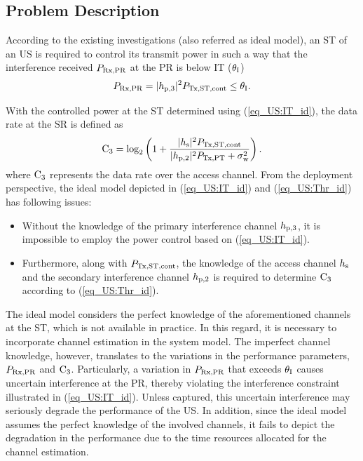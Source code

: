 \subsection{Problem Description} \label{ssec_US:pd}
According to the existing investigations (also referred as ideal model), an ST of an US is required to control its transmit power in such a way that the interference received $P_{\text{Rx,PR}}$ at the PR is below IT ($\theta_{\text{I}}$) \cite{Xing07}
\begin{equation}
P_{\text{Rx,PR}} = |h_{\text{p,3}}|^2 P_{\text{Tx,ST,cont}} \le \theta_{\text{I}}.
\label{eq_US:IT_id}
\end{equation}

With the controlled power at the ST determined using (\ref{eq_US:IT_id}), the data rate at the SR is defined as
\begin{equation}
\text{C}_{\text{3}} = \log_2 \left(1 + \frac{|h_{\text{s}}|^2 P_{\text{Tx,ST,cont}}}{ |h_{\text{p,2}}|^2 P_{\text{Tx,PT}} + \sigma^2_{\text{w}}} \right). 
\label{eq_US:Thr_id}
\end{equation}
where $\text{C}_{\text{3}}$ represents the data rate over the access channel. %
From the deployment perspective, the ideal model depicted in (\ref{eq_US:IT_id}) and (\ref{eq_US:Thr_id}) has following issues:
\begin{itemize}
\item Without the knowledge of the primary interference channel $h_{\text{p,3}}$, it is impossible to employ the power control based on (\ref{eq_US:IT_id}). 
\item Furthermore, along with $P_{\text{Tx,ST,cont}}$, the knowledge of the access channel $h_{\text{s}}$ and the secondary interference channel $h_{\text{p,2}}$ is required to determine $\text{C}_{\text{3}}$ according to (\ref{eq_US:Thr_id}).
\end{itemize}
The ideal model considers the perfect knowledge of the aforementioned channels at the ST, which is not available in practice. In this regard, it is necessary to incorporate channel estimation in the system model. The imperfect channel knowledge, however, translates to the variations in the performance parameters, $P_{\text{Rx,PR}}$ and $\text{C}_{\text{3}}$. Particularly, a variation in $P_{\text{Rx,PR}}$ that exceeds $\theta_{\text{I}}$ causes uncertain interference at the PR, thereby violating the interference constraint illustrated in (\ref{eq_US:IT_id}). Unless captured, this uncertain interference may seriously degrade the performance of the US. In addition, since the ideal model assumes the perfect knowledge of the involved channels, it fails to depict the degradation in the performance due to the time resources allocated for the channel estimation. %


